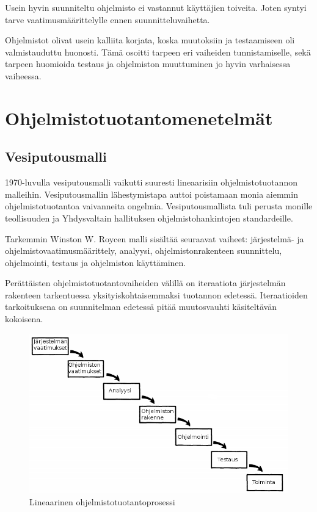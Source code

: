 \documentclass[finnish]{tktltiki2}
\theoremstyle{definition}
\theoremstyle{remark}
\begin{document}
Usein hyvin suunniteltu ohjelmisto ei vastannut käyttäjien toiveita. Joten syntyi tarve vaatimusmäärittelylle ennen suunnitteluvaihetta\cite{BOE88}. 

Ohjelmistot olivat usein kalliita korjata, koska muutoksiin ja testaamiseen oli valmistauduttu huonosti. Tämä osoitti tarpeen eri vaiheiden tunnistamiselle, sekä tarpeen huomioida testaus ja ohjelmiston muuttuminen jo hyvin varhaisessa vaiheessa\cite{BOE88}. 

   

\section{Ohjelmistotuotantomenetelmät}

\subsection{Vesiputousmalli}

1970-luvulla vesiputousmalli vaikutti suuresti lineaarisiin ohjelmistotuotannon malleihin. Vesiputousmallin lähestymistapa auttoi poistamaan monia aiemmin ohjelmistotuotantoa vaivanneita ongelmia. Vesiputousmallista tuli perusta monille teollisuuden ja Yhdysvaltain hallituksen ohjelmistohankintojen standardeille\cite{BOE88}.

Tarkemmin Winston W. Roycen malli sisältää seuraavat vaiheet: järjestelmä- ja ohjelmistovaatimusmäärittely, analyysi, ohjelmistonrakenteen suunnittelu, ohjelmointi, testaus ja ohjelmiston käyttäminen\cite{ROY70}. 

Perättäisten ohjelmistotuotantovaiheiden välillä on iteraatiota järjestelmän rakenteen tarkentuessa yksityiskohtaisemmaksi tuotannon edetessä. Iteraatioiden tarkoituksena on suunnitelman edetessä pitää muutosvauhti käsiteltävän kokoisena\cite{ROY70}.



\begin{figure}[h!]
  \caption{Lineaarinen ohjelmistotuotantoprosessi}
  \centering
    \includegraphics[width=\textwidth]{waterfall}
\end{figure}
\end{document}
